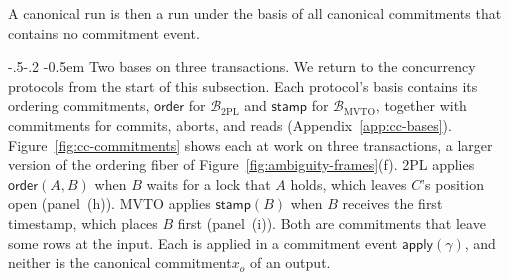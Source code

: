 \documentclass[sigconf]{cidr-2027}
\makeatletter
\theoremstyle{remark}
\renewcommand\paragraph{\@startsection{paragraph}{4}{\z@}%
  {-.5\baselineskip \@plus -2\p@ \@minus -.2\p@}%
  {-0.5em}%
  {\normalfont\bfseries}}
\newcommand{\commitment}{commitment\xspace}
\newcommand{\commitments}{commitments\xspace}
\makeatother
\begin{document}
A canonical run is then a run under the basis of all canonical \commitments that
contains no \commitment event.

\paragraph{Two bases on three transactions.}
We return to the concurrency protocols from the start of this subsection. Each protocol's basis contains its ordering \commitments, $\mathsf{order}$ for
$\mathcal B_{\mathrm{2PL}}$ and $\mathsf{stamp}$ for $\mathcal B_{\mathrm{MVTO}}$,
together with \commitments for commits, aborts, and reads
(Appendix~\ref{app:cc-bases}). Figure~\ref{fig:cc-commitments} shows each at
work on three transactions, a larger version of the ordering fiber of
Figure~\ref{fig:ambiguity-frames}(f).  2PL applies $\mathsf{order}(A,B)$ when
$B$ waits for a lock that $A$ holds, which leaves $C$'s position open
(panel~(h)). MVTO applies $\mathsf{stamp}(B)$ when $B$ receives the first
timestamp, which places $B$ first (panel~(i)). Both are \commitments that
leave some rows at the input. Each is applied in a \commitment event
$\mathsf{apply}(\gamma)$, and neither is the canonical \commitment $x_o$ of
an output.
\end{document}
